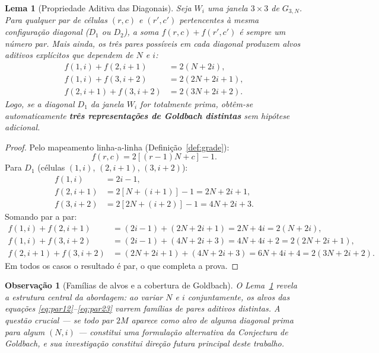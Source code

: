 \documentclass{article}
\newtheorem{lemma}[proposition]{Lema}
\newtheorem{remark}[proposition]{Observação}
\begin{document}
	\begin{lemma}[Propriedade Aditiva das Diagonais]
		\label{lem:aditiva}
		Seja $W_i$ uma janela $3 \times 3$ de $G_{3,N}$. Para qualquer
		par de c\'elulas $(r, c)$ e $(r', c')$ pertencentes \`a mesma
		configura\c{c}\~ao diagonal ($D_1$ ou $D_2$), a soma
		$f(r,c) + f(r',c')$ \'e sempre um n\'umero par.
		Mais ainda, os tr\^es pares poss\'iveis em cada diagonal produzem
		alvos aditivos expl\'icitos que dependem de $N$ e $i$:
		\begin{align}
			f(1,i) + f(2,i+1) &= 2(N + 2i), \label{eq:par12} \\
			f(1,i) + f(3,i+2) &= 2(2N + 2i + 1), \label{eq:par13} \\
			f(2,i+1) + f(3,i+2) &= 2(3N + 2i + 2). \label{eq:par23}
		\end{align}
		Logo, se a diagonal $D_1$ da janela $W_i$ for totalmente prima,
		obt\^em-se automaticamente \textbf{tr\^es representa\c{c}\~oes de
			Goldbach distintas} sem hip\'otese adicional.
	\end{lemma}
	
	\begin{proof}
		Pelo mapeamento linha-a-linha (Defini\c{c}\~ao~\ref{def:grade}):
		\[
		f(r,c) = 2[(r-1)N + c] - 1.
		\]
		Para $D_1$ (c\'elulas $(1,i)$, $(2,i+1)$, $(3,i+2)$):
		\begin{align*}
			f(1,i) &= 2i - 1, \\
			f(2,i+1) &= 2[N + (i+1)] - 1 = 2N + 2i + 1, \\
			f(3,i+2) &= 2[2N + (i+2)] - 1 = 4N + 2i + 3.
		\end{align*}
		Somando par a par:
		\begin{align*}
			f(1,i) + f(2,i+1) &= (2i-1) + (2N+2i+1) = 2N + 4i = 2(N+2i),\\
			f(1,i) + f(3,i+2) &= (2i-1) + (4N+2i+3) = 4N + 4i + 2 = 2(2N+2i+1),\\
			f(2,i+1) + f(3,i+2) &= (2N+2i+1) + (4N+2i+3) = 6N+4i+4 = 2(3N+2i+2).
		\end{align*}
		Em todos os casos o resultado \'e par, o que completa a prova.
	\end{proof}
	
	\begin{remark}[Fam\'ilias de alvos e a cobertura de Goldbach]
		\label{rem:familias}
		O Lema~\ref{lem:aditiva} revela a estrutura central da abordagem:
		ao variar $N$ e $i$ conjuntamente, os alvos das equa\c{c}\~oes
		\eqref{eq:par12}--\eqref{eq:par23} varrem fam\'ilias de pares
		aditivos distintas. A quest\~ao crucial --- se todo par $2M$
		aparece como alvo de alguma diagonal prima para algum $(N, i)$
		--- constitui uma formula\c{c}\~ao alternativa da Conjectura de
		Goldbach, e sua investiga\c{c}\~ao constitui dire\c{c}\~ao futura
		principal deste trabalho.
	\end{remark}
	
\end{document}
